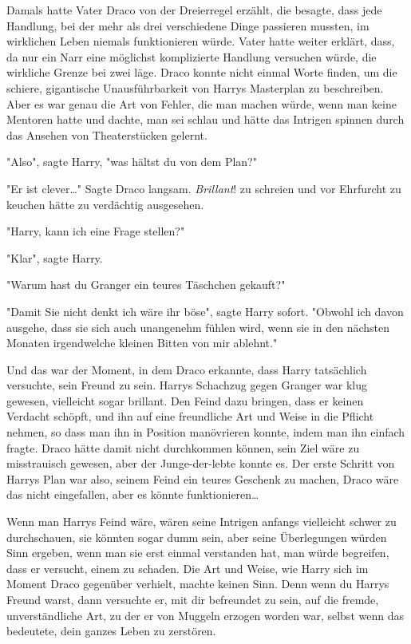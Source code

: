 {Damals hatte Vater Draco von der Dreierregel erzählt, die besagte, dass jede Handlung, bei der mehr als drei verschiedene Dinge passieren mussten, im wirklichen Leben niemals funktionieren würde. Vater hatte weiter erklärt, dass, da nur ein Narr eine möglichst komplizierte Handlung versuchen würde, die wirkliche Grenze bei zwei läge. Draco konnte nicht einmal Worte finden, um die schiere, gigantische Unausführbarkeit von Harrys Masterplan zu beschreiben. Aber es war genau die Art von Fehler, die man machen würde, wenn man keine Mentoren hatte und dachte, man sei schlau und hätte das Intrigen spinnen durch das Ansehen von Theaterstücken gelernt.

"Also", sagte Harry, "was hältst du von dem Plan?"

"Er ist clever…" Sagte Draco langsam. \emph{Brillant}! zu schreien und vor Ehrfurcht zu keuchen hätte zu verdächtig ausgesehen.

"Harry, kann ich eine Frage stellen?"

"Klar", sagte Harry.

"Warum hast du Granger ein teures Täschchen gekauft?"

"Damit Sie nicht denkt ich wäre ihr böse", sagte Harry sofort. "Obwohl ich davon ausgehe, dass sie sich auch unangenehm fühlen wird, wenn sie in den nächsten Monaten irgendwelche kleinen Bitten von mir ablehnt."

Und das war der Moment, in dem Draco erkannte, dass Harry tatsächlich versuchte, sein Freund zu sein. Harrys Schachzug gegen Granger war klug gewesen, vielleicht sogar brillant. Den Feind dazu bringen, dass er keinen Verdacht schöpft, und ihn auf eine freundliche Art und Weise in die Pflicht nehmen, so dass man ihn in Position manövrieren konnte, indem man ihn einfach fragte. Draco hätte damit nicht durchkommen können, sein Ziel wäre zu misstrauisch gewesen, aber der Junge-der-lebte konnte es. Der erste Schritt von Harrys Plan war also, seinem Feind ein teures Geschenk zu machen, Draco wäre das nicht eingefallen, aber es könnte funktionieren…

Wenn man Harrys Feind wäre, wären seine Intrigen anfangs vielleicht schwer zu durchschauen, sie könnten sogar dumm sein, aber seine Überlegungen würden Sinn ergeben, wenn man sie erst einmal verstanden hat, man würde begreifen, dass er versucht, einem zu schaden. Die Art und Weise, wie Harry sich im Moment Draco gegenüber verhielt, machte keinen Sinn. Denn wenn du Harrys Freund warst, dann versuchte er, mit dir befreundet zu sein, auf die fremde, unverständliche Art, zu der er von Muggeln erzogen worden war, selbst wenn das bedeutete, dein ganzes Leben zu zerstören.

}
